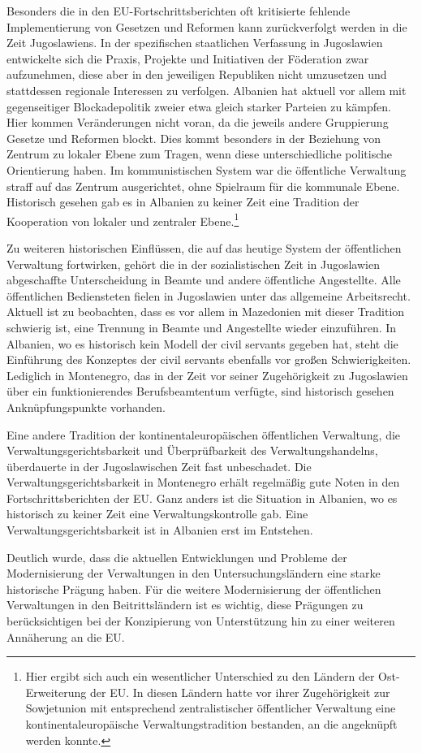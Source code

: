 Besonders die in den EU-Fortschrittsberichten oft kritisierte fehlende Implementierung von Gesetzen und Reformen kann zurückverfolgt werden in die Zeit Jugoslawiens. In der spezifischen staatlichen Verfassung in Jugoslawien entwickelte sich die Praxis, Projekte und Initiativen der Föderation zwar aufzunehmen, diese aber in den jeweiligen Republiken nicht umzusetzen und stattdessen regionale Interessen zu verfolgen. Albanien hat aktuell vor allem mit gegenseitiger Blockadepolitik zweier etwa gleich starker Parteien zu kämpfen. Hier kommen Veränderungen nicht voran, da die jeweils andere Gruppierung Gesetze und Reformen blockt. Dies kommt besonders in der Beziehung von Zentrum zu lokaler Ebene zum Tragen, wenn diese unterschiedliche politische Orientierung haben. Im kommunistischen System war die öffentliche Verwaltung straff auf das Zentrum ausgerichtet, ohne Spielraum für die kommunale Ebene. Historisch gesehen gab es in Albanien zu keiner Zeit eine Tradition der Kooperation von lokaler und zentraler Ebene.\footnote{Hier ergibt sich auch ein wesentlicher Unterschied zu den Ländern der Ost-Erweiterung der EU. In diesen Ländern hatte vor ihrer Zugehörigkeit zur Sowjetunion mit entsprechend zentralistischer öffentlicher Verwaltung eine kontinentaleuropäische Verwaltungstradition bestanden, an die angeknüpft werden konnte.
}\par
Zu weiteren historischen Einflüssen, die auf das heutige System der öffentlichen Verwaltung fortwirken, gehört die in der sozialistischen Zeit in Jugoslawien abgeschaffte Unterscheidung in Beamte und andere öffentliche Angestellte. Alle öffentlichen Bediensteten fielen in Jugoslawien unter das allgemeine Arbeitsrecht. Aktuell ist zu beobachten, dass es vor allem in Mazedonien mit dieser Tradition schwierig ist, eine Trennung in Beamte und Angestellte wieder einzuführen. In Albanien, wo es historisch kein Modell der civil servants gegeben hat, steht die Einführung des Konzeptes der civil servants ebenfalls vor großen Schwierigkeiten. Lediglich in Montenegro, das in der Zeit vor seiner Zugehörigkeit zu Jugoslawien über ein funktionierendes Berufsbeamtentum verfügte, sind historisch gesehen Anknüpfungspunkte vorhanden. \par
Eine andere Tradition der kontinentaleuropäischen öffentlichen Verwaltung, die Verwaltungsgerichtsbarkeit und Überprüfbarkeit des Verwaltungshandelns, überdauerte in der Jugoslawischen Zeit fast unbeschadet. Die Verwaltungsgerichtsbarkeit in Montenegro erhält regelmäßig gute Noten in den Fortschrittsberichten der EU. Ganz anders ist die Situation in Albanien, wo es historisch zu keiner Zeit eine Verwaltungskontrolle gab. Eine Verwaltungsgerichtsbarkeit ist in Albanien erst im Entstehen. \par
Deutlich wurde, dass die aktuellen Entwicklungen und Probleme der Modernisierung der Verwaltungen in den Untersuchungsländern eine starke historische Prägung haben. Für die weitere Modernisierung der öffentlichen Verwaltungen in den Beitrittsländern ist es wichtig, diese Prägungen zu berücksichtigen bei der Konzipierung von Unterstützung hin zu einer weiteren Annäherung an die EU.

